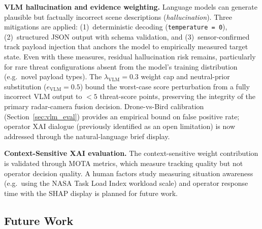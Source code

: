 \documentclass[drones,article,submit,pdftex]{Definitions/mdpi}
\begin{document}
\textbf{VLM hallucination and evidence weighting.}
Language models can generate plausible but factually incorrect scene descriptions
(\emph{hallucination}).
Three mitigations are applied: (1)~deterministic decoding (\texttt{temperature = 0}),
(2)~structured JSON output with schema validation, and
(3)~sensor-confirmed track payload injection that anchors the model to
empirically measured target state.
Even with these measures, residual hallucination risk remains, particularly for
rare threat configurations absent from the model's training distribution
(e.g.\ novel payload types).
The $\lambda_\text{VLM} = 0.3$ weight cap and neutral-prior substitution
($e_\text{VLM} = 0.5$) bound the worst-case score perturbation from a
fully incorrect VLM output to $< 5$ threat-score points, preserving the
integrity of the primary radar-camera fusion decision.
Drone-vs-Bird calibration (Section~\ref{sec:vlm_eval}) provides an
empirical bound on false positive rate; operator XAI dialogue
(previously identified as an open limitation) is now addressed through
the natural-language brief display.

\textbf{Context-Sensitive XAI evaluation.}
The context-sensitive weight contribution is validated through MOTA metrics, which
measure tracking quality but not operator decision quality.
A human factors study measuring situation awareness (e.g.\ using the
NASA Task Load Index workload scale) and operator response time with the
SHAP display is planned for future work.

\subsection{Future Work}
\end{document}
